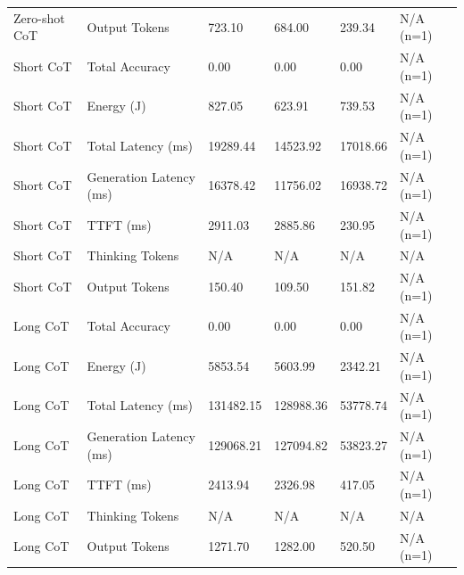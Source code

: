 \begin{table}
\begin{tabular}{llllll}
Zero-shot CoT & Output Tokens & 723.10 & 684.00 & 239.34 & N/A (n=1) \\
Short CoT & Total Accuracy & 0.00 & 0.00 & 0.00 & N/A (n=1) \\
Short CoT & Energy (J) & 827.05 & 623.91 & 739.53 & N/A (n=1) \\
Short CoT & Total Latency (ms) & 19289.44 & 14523.92 & 17018.66 & N/A (n=1) \\
Short CoT & Generation Latency (ms) & 16378.42 & 11756.02 & 16938.72 & N/A (n=1) \\
Short CoT & TTFT (ms) & 2911.03 & 2885.86 & 230.95 & N/A (n=1) \\
Short CoT & Thinking Tokens & N/A & N/A & N/A & N/A \\
Short CoT & Output Tokens & 150.40 & 109.50 & 151.82 & N/A (n=1) \\
Long CoT & Total Accuracy & 0.00 & 0.00 & 0.00 & N/A (n=1) \\
Long CoT & Energy (J) & 5853.54 & 5603.99 & 2342.21 & N/A (n=1) \\
Long CoT & Total Latency (ms) & 131482.15 & 128988.36 & 53778.74 & N/A (n=1) \\
Long CoT & Generation Latency (ms) & 129068.21 & 127094.82 & 53823.27 & N/A (n=1) \\
Long CoT & TTFT (ms) & 2413.94 & 2326.98 & 417.05 & N/A (n=1) \\
Long CoT & Thinking Tokens & N/A & N/A & N/A & N/A \\
Long CoT & Output Tokens & 1271.70 & 1282.00 & 520.50 & N/A (n=1) \\
\bottomrule
\end{tabular}
\end{table}
